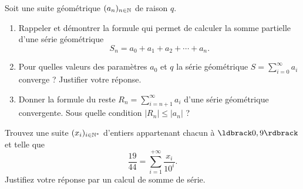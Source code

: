 \documentclass[a4paper,12pt,reqno]{amsart}
\begin{document}


\begin{exo} %

  Soit une suite géométrique $(a_{n})_{n \in \mathbb{N}}$ de raison $q$.
  \begin{enumerate}
    \item Rappeler et démontrer la formule qui permet de calculer la somme partielle d'une série géométrique
      \[
        S_{n}=a_{0}+a_{1}+a_{2}+\cdots+a_{n}.
      \]

    \item Pour quelles valeurs des paramètres $a_{0}$ et $q$ la série géométrique $S = \sum_{i=0}^{\infty} a_{i}$ converge ? Justifier votre réponse.

    \item Donner la formule du reste $R_{n} = \sum_{i=n+1}^{\infty} a_{i}$ d'une série géométrique convergente. Sous quelle condition $| R_{n} | \leq | a_{n} |$ ?
  \end{enumerate}

\end{exo}

\begin{exo} %

  Trouvez une suite $(x_i)_{i \in \mathbb{N}^*}$ d'entiers appartenant chacun à $\iintv{0,9}$ et telle que
    \[
      \frac{19}{44}=\sum_{i=1}^{+\infty}\frac{x_i}{10^i}.
    \]
  Justifiez votre réponse par un calcul de somme de série.

\end{exo}
\end{document}
